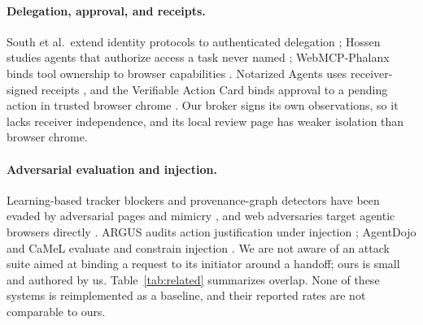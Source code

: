 \documentclass[11pt]{article}
\theoremstyle{definition}
\begin{document}
\paragraph{Delegation, approval, and receipts.} South et al.\ extend identity
protocols to authenticated delegation \cite{south2025}; Hossen studies agents that
authorize access a task never named \cite{hossen2026}; WebMCP-Phalanx binds tool
ownership to browser capabilities \cite{lee2026}. Notarized Agents uses
receiver-signed receipts \cite{figuera2026}, and the Verifiable Action Card binds
approval to a pending action in trusted browser chrome \cite{irshad2026}. Our
broker signs its own observations, so it lacks receiver independence, and its
local review page has weaker isolation than browser chrome.

\paragraph{Adversarial evaluation and injection.} Learning-based tracker blockers
and provenance-graph detectors have been evaded by adversarial pages and mimicry
\cite{webgraph,goyal2023mimicry}, and web adversaries target agentic browsers
directly \cite{datta2026waaa}. ARGUS audits action justification under injection
\cite{weng2026}; AgentDojo and CaMeL evaluate and constrain injection
\cite{agentdojo,camel}. We are not aware of an attack suite aimed at binding a
request to its initiator around a handoff; ours is small and authored by us.
Table~\ref{tab:related} summarizes overlap. None of these systems is reimplemented
as a baseline, and their reported rates are not comparable to ours.
\end{document}
